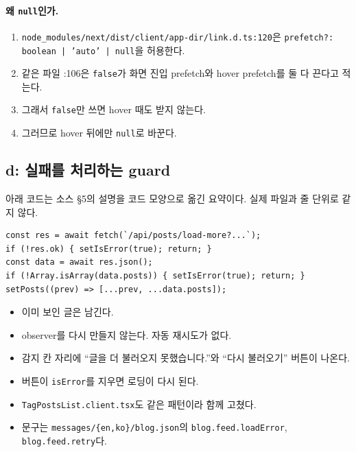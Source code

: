 \paragraph{왜 \texttt{null}인가.}
\begin{enumerate}[nosep]
  \item \texttt{node\_modules/next/dist/client/app-dir/link.d.ts:120}은 \texttt{prefetch?: boolean | 'auto' | null}을 허용한다.
  \item 같은 파일 :106은 \texttt{false}가 화면 진입 prefetch와 hover prefetch를 둘 다 끈다고 적는다.
  \item 그래서 \texttt{false}만 쓰면 hover 때도 받지 않는다.
  \item 그러므로 hover 뒤에만 \texttt{null}로 바꾼다.
\end{enumerate}

\subsection{d: 실패를 처리하는 guard}\label{sec:pf-guard}

아래 코드는 소스 §5의 설명을 코드 모양으로 옮긴 요약이다.
실제 파일과 줄 단위로 같지 않다.

\begin{lstlisting}
const res = await fetch(`/api/posts/load-more?...`);
if (!res.ok) { setIsError(true); return; }
const data = await res.json();
if (!Array.isArray(data.posts)) { setIsError(true); return; }
setPosts((prev) => [...prev, ...data.posts]);
\end{lstlisting}

\begin{itemize}[nosep]
  \item 이미 보인 글은 남긴다.
  \item observer를 다시 만들지 않는다. 자동 재시도가 없다.
  \item 감지 칸 자리에 ``글을 더 불러오지 못했습니다.''와 ``다시 불러오기'' 버튼이 나온다.
  \item 버튼이 \texttt{isError}를 지우면 로딩이 다시 된다.
  \item \texttt{TagPostsList.client.tsx}도 같은 패턴이라 함께 고쳤다.
  \item 문구는 \texttt{messages/\{en,ko\}/blog.json}의 \texttt{blog.feed.loadError}, \texttt{blog.feed.retry}다.
\end{itemize}

